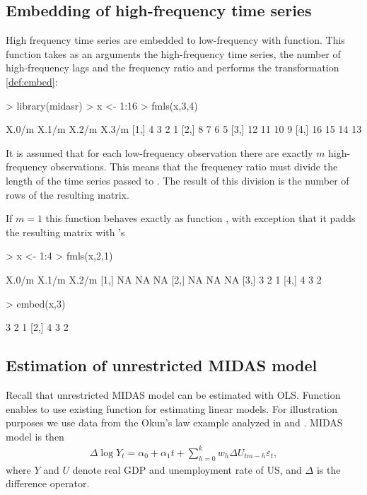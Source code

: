 \documentclass[nojss]{jss}
\begin{document}
 

\subsection{Embedding of high-frequency time series }

High frequency time series are embedded to low-frequency with 
function. This function takes as an arguments the high-frequency time
series, the number of high-frequency lags and the frequency ratio and
performs the transformation \eqref{def:embed}: 
\begin{Schunk}
\begin{Sinput}
> library(midasr)
> x <- 1:16
> fmls(x,3,4)
\end{Sinput}
\begin{Soutput}
     X.0/m X.1/m X.2/m X.3/m
[1,]     4     3     2     1
[2,]     8     7     6     5
[3,]    12    11    10     9
[4,]    16    15    14    13
\end{Soutput}
\end{Schunk}
It is assumed that for each low-frequency observation there are
exactly $m$ high-frequency observations. This means that the frequency
ratio must divide the length of
the time series passed to . The result of this division is
the number of rows of the resulting matrix. 

If $m=1$ this function behaves
exactly as function , with exception that it padds the
resulting matrix with 's
\begin{Schunk}
\begin{Sinput}
> x <- 1:4
> fmls(x,2,1)
\end{Sinput}
\begin{Soutput}
     X.0/m X.1/m X.2/m
[1,]    NA    NA    NA
[2,]    NA    NA    NA
[3,]     3     2     1
[4,]     4     3     2
\end{Soutput}
\begin{Sinput}
> embed(x,3)
\end{Sinput}
\begin{Soutput}
     [,1] [,2] [,3]
[1,]    3    2    1
[2,]    4    3    2
\end{Soutput}
\end{Schunk}

\subsection{Estimation of unrestricted MIDAS model}


Recall that unrestricted MIDAS model can be estimated with OLS. Function
 enables to 
use existing  function  for estimating linear models.
For illustration purposes we use data from the Okun's law example
analyzed in \cite{kz:2012} and \cite{kvedaras_regression_2010}. 
MIDAS model is then
\begin{align*}
  \Delta \log Y_t = \alpha_0 + \alpha_1 t + \sum_{h=0}^kw_h\Delta U_{tm-h}\varepsilon_t,
\end{align*}
where $Y$ and $U$ denote real GDP and unemployment rate of US, and
$\Delta$ is the difference operator.
\end{document}
